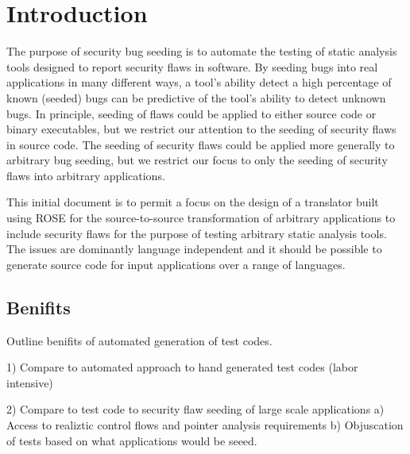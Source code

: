 \section{Introduction}


   The purpose of security bug seeding is to automate the testing of static analysis
tools designed to report security flaws in software.  By seeding bugs into
real applications in many different ways, a tool's ability detect a high
percentage of known (seeded) bugs can be predictive of the tool's
ability to detect unknown bugs.  In principle, seeding of flaws could be applied 
to either source code or binary executables, but we restrict our attention to 
the seeding of security flaws in source code.  The seeding of security flaws 
could be applied more generally to arbitrary bug seeding, but we 
restrict our focus to only the seeding of security flaws into arbitrary applications.

   This initial document is to permit a focus on the design of
a translator built using ROSE for the source-to-source transformation
of arbitrary applications to include security flaws for the purpose
of testing arbitrary static analysis tools.  The issues are dominantly
language independent and it should be possible to generate source
code for input applications over a range of languages.

\subsection{Benifits}
   Outline benifits of automated generation of test codes.

1) Compare to automated approach to hand generated test codes (labor intensive)

2) Compare to test code to security flaw seeding of large scale applications
   a) Access to realiztic control flows and pointer analysis requirements
   b) Objuscation of tests based on what applications would be seeed.

